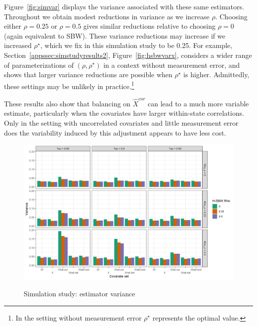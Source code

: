 Figure~\ref{fig:simvar} displays the variance associated with these same estimators. Throughout we obtain modest reductions in variance as we increase $\rho$. Choosing either $\rho = 0.25$ or $\rho = 0.5$ gives similar reductions relative to choosing $\rho = 0$ (again equivalent to SBW). These variance reductions may increase if we increased $\rho^\star$, which we fix in this simulation study to be 0.25. For example, Section~\ref{appssec:simstudyresults2}, Figure~\ref{fig:hsbwvarx}, considers a wider range of parameterizations of $(\rho, \rho^\star)$ in a context without measurement error, and shows that larger variance reductions are possible when $\rho^\star$ is higher. Admittedly, these settings may be unlikely in practice.\footnote{In the setting without measurement error $\rho^\star$ represents the optimal value.}

These results also show that balancing on $\hat{X}^{cor}$ can lead to a much more variable estimate, particularly when the covariates have larger within-state correlations. Only in the setting with uncorrelated covariates and little measurement error does the variability induced by this adjustment appears to have less cost.

\begin{figure}[H]
\begin{center}
    \caption{Simulation study: estimator variance}\label{fig:simvar}
    \label{fig:loveplotc1}
    \includegraphics[scale=0.5]{01_Plots/var-plot.png}
\end{center}
\end{figure}

